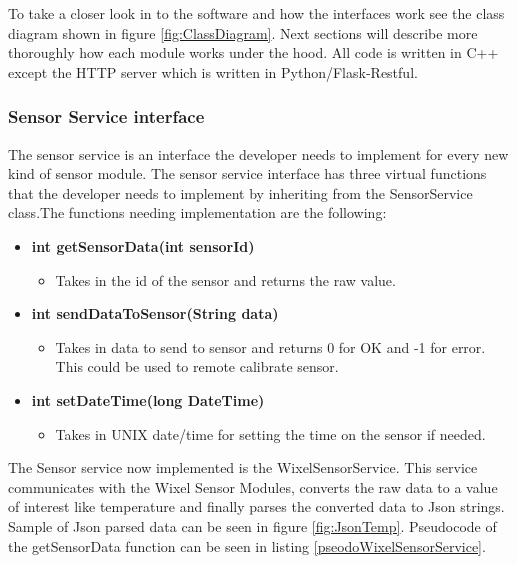 To take a closer look in to the software and how the interfaces work see the class diagram
shown in figure \ref{fig:ClassDiagram}. Next sections will describe more thoroughly how each module works under the hood. All code is written in C++ except the HTTP server which is written in Python/Flask-Restful.

\subsubsection{Sensor Service interface}
The sensor service is an interface the developer needs to implement for every new kind of
sensor module. The sensor service interface has three virtual functions that the developer
needs to implement by inheriting from the SensorService class.The functions needing implementation are the following:
\begin{itemize}
    \item \textbf{int getSensorData(int sensorId)}
        \begin{itemize}
            \item Takes in the id of the sensor and returns the raw value.
        \end{itemize}
    \item \textbf{int sendDataToSensor(String data)}
        \begin{itemize}
            \item Takes in data to send to sensor and returns 0 for OK and -1 for error.
                  This could be used to remote calibrate sensor.
        \end{itemize}
    \item \textbf{int setDateTime(long DateTime)}
        \begin{itemize}
            \item Takes in UNIX date/time for setting the time on the sensor if needed.
        \end{itemize}
\end{itemize}
The Sensor service now implemented is the WixelSensorService. This service communicates 
with the Wixel Sensor Modules, converts the raw data to a value of interest like 
temperature and finally parses the converted data to Json\cite{json} strings. Sample
of Json parsed data can be seen in figure \ref{fig:JsonTemp}. Pseudocode of the 
getSensorData function can be seen in listing \ref{pseodoWixelSensorService}.

